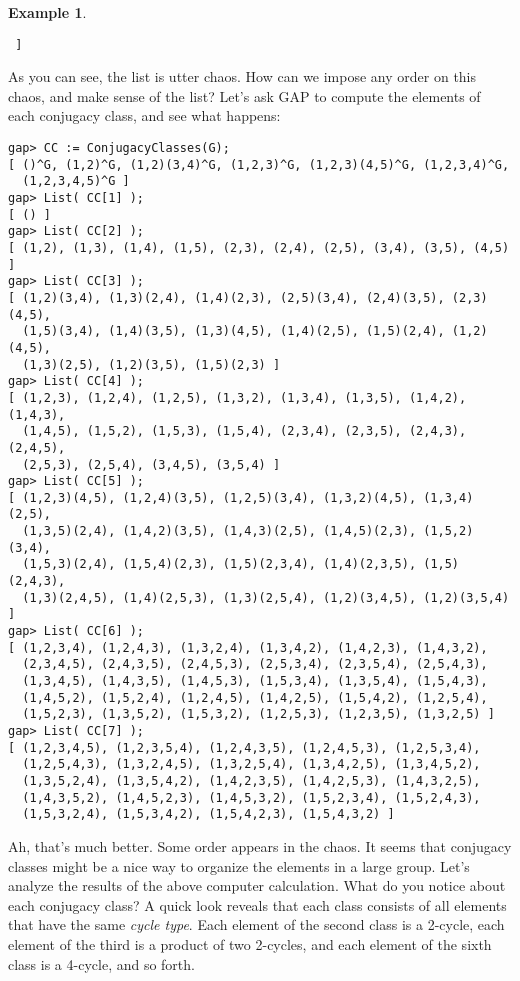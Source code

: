 \documentclass[11pt,oneside]{article}
\theoremstyle{definition}
\newtheorem{example}[thm]{Example}
\begin{document}
\begin{example}
\begin{verbatim}
 ]
\end{verbatim}\normalsize
As you can see, the list is utter chaos. How can we impose any order
on this chaos, and make sense of the list? Let's ask GAP to compute
the elements of each conjugacy class, and see what happens: \tiny
\begin{verbatim}
gap> CC := ConjugacyClasses(G);
[ ()^G, (1,2)^G, (1,2)(3,4)^G, (1,2,3)^G, (1,2,3)(4,5)^G, (1,2,3,4)^G, 
  (1,2,3,4,5)^G ]
gap> List( CC[1] );
[ () ]
gap> List( CC[2] );
[ (1,2), (1,3), (1,4), (1,5), (2,3), (2,4), (2,5), (3,4), (3,5), (4,5) ]
gap> List( CC[3] );
[ (1,2)(3,4), (1,3)(2,4), (1,4)(2,3), (2,5)(3,4), (2,4)(3,5), (2,3)(4,5), 
  (1,5)(3,4), (1,4)(3,5), (1,3)(4,5), (1,4)(2,5), (1,5)(2,4), (1,2)(4,5), 
  (1,3)(2,5), (1,2)(3,5), (1,5)(2,3) ]
gap> List( CC[4] );
[ (1,2,3), (1,2,4), (1,2,5), (1,3,2), (1,3,4), (1,3,5), (1,4,2), (1,4,3), 
  (1,4,5), (1,5,2), (1,5,3), (1,5,4), (2,3,4), (2,3,5), (2,4,3), (2,4,5), 
  (2,5,3), (2,5,4), (3,4,5), (3,5,4) ]
gap> List( CC[5] );
[ (1,2,3)(4,5), (1,2,4)(3,5), (1,2,5)(3,4), (1,3,2)(4,5), (1,3,4)(2,5), 
  (1,3,5)(2,4), (1,4,2)(3,5), (1,4,3)(2,5), (1,4,5)(2,3), (1,5,2)(3,4), 
  (1,5,3)(2,4), (1,5,4)(2,3), (1,5)(2,3,4), (1,4)(2,3,5), (1,5)(2,4,3), 
  (1,3)(2,4,5), (1,4)(2,5,3), (1,3)(2,5,4), (1,2)(3,4,5), (1,2)(3,5,4) ]
gap> List( CC[6] );
[ (1,2,3,4), (1,2,4,3), (1,3,2,4), (1,3,4,2), (1,4,2,3), (1,4,3,2), 
  (2,3,4,5), (2,4,3,5), (2,4,5,3), (2,5,3,4), (2,3,5,4), (2,5,4,3), 
  (1,3,4,5), (1,4,3,5), (1,4,5,3), (1,5,3,4), (1,3,5,4), (1,5,4,3), 
  (1,4,5,2), (1,5,2,4), (1,2,4,5), (1,4,2,5), (1,5,4,2), (1,2,5,4), 
  (1,5,2,3), (1,3,5,2), (1,5,3,2), (1,2,5,3), (1,2,3,5), (1,3,2,5) ]
gap> List( CC[7] );
[ (1,2,3,4,5), (1,2,3,5,4), (1,2,4,3,5), (1,2,4,5,3), (1,2,5,3,4), 
  (1,2,5,4,3), (1,3,2,4,5), (1,3,2,5,4), (1,3,4,2,5), (1,3,4,5,2), 
  (1,3,5,2,4), (1,3,5,4,2), (1,4,2,3,5), (1,4,2,5,3), (1,4,3,2,5), 
  (1,4,3,5,2), (1,4,5,2,3), (1,4,5,3,2), (1,5,2,3,4), (1,5,2,4,3), 
  (1,5,3,2,4), (1,5,3,4,2), (1,5,4,2,3), (1,5,4,3,2) ]
\end{verbatim}\normalsize
Ah, that's much better. Some order appears in the chaos. It seems that
conjugacy classes might be a nice way to organize the elements in a
large group. Let's analyze the results of the above computer
calculation. What do you notice about each conjugacy class? A quick
look reveals that each class consists of all elements that have the
same {\em cycle type}. Each element of the second class is a 2-cycle,
each element of the third is a product of two 2-cycles, and each
element of the sixth class is a 4-cycle, and so forth.
\end{example}
\end{document}
